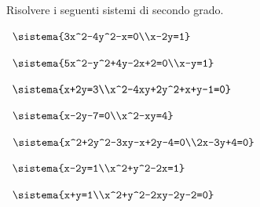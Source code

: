 \begin{esercizio}[*]
\label{ese:6.7}
Risolvere i seguenti sistemi di secondo grado.
\begin{enumeratea}
\item~\(\sistema{3x^2-4y^2-x=0\\x-2y=1}\)

\item~\(\sistema{5x^2-y^2+4y-2x+2=0\\x-y=1}\)

\item~\(\sistema{x+2y=3\\x^2-4xy+2y^2+x+y-1=0}\)
\item~\(\sistema{x-2y-7=0\\x^2-xy=4}\)
\item~\(\sistema{x^2+2y^2-3xy-x+2y-4=0\\2x-3y+4=0}\)
\item~\(\sistema{x-2y=1\\x^2+y^2-2x=1}\)

\item~\(\sistema{x+y=1\\x^2+y^2-2xy-2y-2=0}\)
%  
\end{enumeratea}
\end{esercizio}

